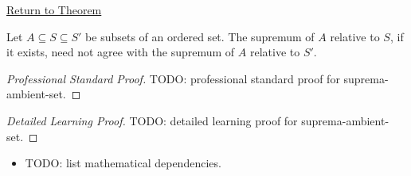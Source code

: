 \newpage
{}
\label{prf:suprema-ambient-set}

\begin{remark*}[Return]
\hyperref[prop:suprema-ambient-set]{Return to Theorem}
\end{remark*}

\begin{proposition*}
Let $A\subseteq S\subseteq S'$ be subsets of an ordered set. The supremum of $A$ relative to $S$, if it exists, need not agree with the supremum of $A$ relative to $S'$.
\end{proposition*}

\begin{proof}[Professional Standard Proof]
\LRAProofBodyStart
TODO: professional standard proof for suprema-ambient-set.
\end{proof}

\begin{proof}[Detailed Learning Proof]
\LRAProofBodyStart
TODO: detailed learning proof for suprema-ambient-set.
\end{proof}

\begin{remark*}
\end{remark*}

\begin{dependencies}
\begin{itemize}
  \item TODO: list mathematical dependencies.
\end{itemize}
\end{dependencies}

\clearpage
